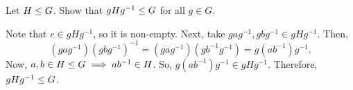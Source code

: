 \documentclass[11pt]{penrose}
\begin{document}
\begin{nex}
    Let $H \mathrel{\leq} G$. Show that $gHg^{-1} \mathrel{\leq} G$ for all $g \in G$.

    Note that $e \in gHg^{-1}$, so it is non-empty. Next, take $gag^{-1}, gbg^{-1} \in gHg^{-1}$. Then,
    \begin{equation*}
        (gag^{-1})(gbg^{-1})^{-1} = (gag^{-1})(gb^{-1}g^{-1}) = g (ab^{-1}) g^{-1}.
    \end{equation*}
    Now, $a, b \in H \mathrel{\leq} G \implies ab^{-1} \in H$. So, $g (ab^{-1}) g^{-1} \in gHg^{-1}$. Therefore, $gHg^{-1} \mathrel{\leq} G$.
\end{nex}
\end{document}

